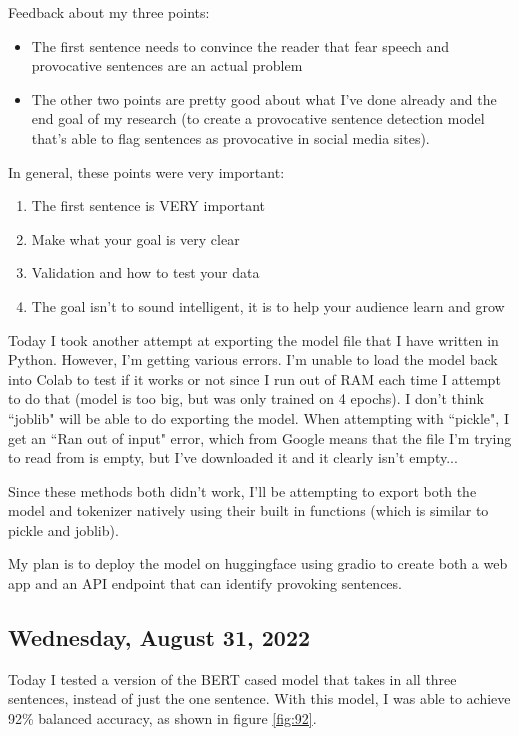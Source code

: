 \documentclass[11pt,letterpaper]{article}
\begin{document}
Feedback about my three points:
\begin{itemize}
    \item The first sentence needs to convince the reader that fear speech and provocative sentences are an actual problem
    \item The other two points are pretty good about what I've done already and the end goal of my research (to create a provocative sentence detection model that's able to flag sentences as provocative in social media sites).
\end{itemize}

In general, these points were very important:
\begin{enumerate}
    \item The first sentence is VERY important
    \item Make what your goal is very clear
    \item Validation and how to test your data
    \item The goal isn't to sound intelligent, it is to help your audience learn and grow
\end{enumerate}

Today I took another attempt at exporting the model file that I have written in Python. However, I'm getting various errors. I'm unable to load the model back into Colab to test if it works or not since I run out of RAM each time I attempt to do that (model is too big, but was only trained on 4 epochs). I don't think ``joblib" will be able to do exporting the model. When attempting with ``pickle", I get an ``Ran out of input" error, which from Google means that the file I'm trying to read from is empty, but I've downloaded it and it clearly isn't empty...

Since these methods both didn't work, I'll be attempting to export both the model and tokenizer natively using their built in functions (which is similar to pickle and joblib).

My plan is to deploy the model on huggingface using gradio to create both a web app and an API endpoint that can identify provoking sentences.

\subsection{Wednesday, August 31, 2022}
Today I tested a version of the BERT cased model that takes in all three sentences, instead of just the one sentence. With this model, I was able to achieve 92\% balanced accuracy, as shown in figure \ref{fig:92}.
\end{document}
